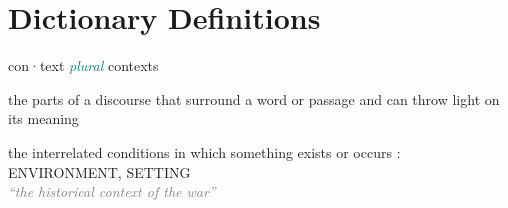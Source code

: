 \documentclass[a4paper, DIV=13, BCOR=0cm]{scrbook}
\begin{document}
\clearpage
\printnoidxglossaries

\printbibliography

\newpage

\section{Dictionary Definitions }
\label{dictionary}

\begin{mdframed}[style=dictionary, frametitle={context {\scriptsize\normalfont\textsc{noun \hfill Merriam-Webster}}}]{
	\small con·​text \textit{\textcolor{teal}{plural}} contexts
		\begin{compactenum}
			\item the parts of a discourse that surround a word or passage and can throw light on its meaning
			\item the interrelated conditions in which something exists or occurs : ENVIRONMENT, SETTING \\
			\textcolor{gray}{\textit{\enquote{the historical context of the war}}}
		\end{compactenum}
	}
\end{mdframed}
\end{document}
